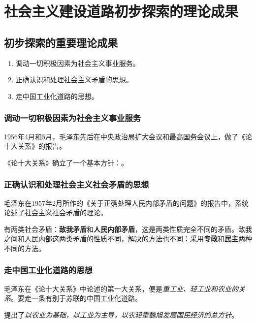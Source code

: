 \chapter{社会主义建设道路初步探索的理论成果}

\section{初步探索的重要理论成果}
\begin{enumerate}
    \item 调动一切积极因素为社会主义事业服务。
    \item 正确认识和处理社会主义矛盾的思想。
    \item 走中国工业化道路的思想。
\end{enumerate}

    \subsection{调动一切积极因素为社会主义事业服务}
    1956年4月和5月，毛泽东先后在中央政治局扩大会议和最高国务会议上，做了《论十大关系》的报告。


    《论十大关系》确立了一个基本方针：。

    \subsection{正确认识和处理社会主义社会矛盾的思想}
    毛泽东在1957年2月所作的《关于正确处理人民内部矛盾的问题》的报告中，系统论述了社会主义社会矛盾的理论。
    
    有两类社会矛盾：\textbf{敌我矛盾}和\textbf{人民内部矛盾}，这是两类性质完全不同的矛盾。敌我之间和人民内部这两类矛盾的性质不同，解决的方法也不同：采用\textbf{专政}和\textbf{民主}两种不同的方法。

    \subsection{走中国工业化道路的思想}
    毛泽东在《论十大关系》中论述的第一大关系，便是\emph{重工业、轻工业和农业的关系}。要走一条有别于苏联的中国工业化道路。

    提出了\emph{以农业为基础，以工业为主导，以农轻重魏旭发展国民经济的总方针}。


